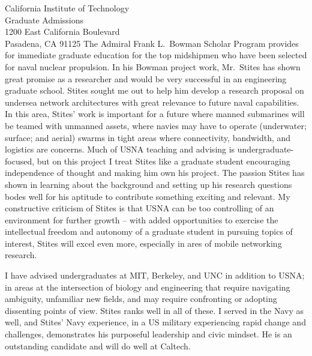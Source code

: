 \documentclass[10pt]{wrceletter}
\begin{document}
\begin{letter}{%
California Institute of Technology\\
Graduate Admissions\\
1200 East California Boulevard\\
Pasadena, CA 91125}
The Admiral Frank L.~Bowman Scholar Program provides for immediate graduate education for the top midshipmen who have been selected for naval nuclear propulsion. In his Bowman project work, Mr.~Stites has shown great promise as a researcher and would be very successful in an engineering graduate school. Stites sought me out to help him develop a research proposal on undersea network architectures with great relevance to future naval capabilities. In this area, Stites' work is important for a future where manned submarines will be teamed with unmanned assets, where navies may have to operate (underwater; surface; and aerial) swarms in tight areas where connectivity, bandwidth, and logistics are concerns. Much of USNA teaching and advising is undergraduate-focused, but on this project I treat Stites like a graduate student encouraging independence of thought and making him own his project. The passion Stites has shown in learning about the background and setting up his research questions bodes well for his aptitude to contribute something exciting and relevant. My constructive criticism of Stites is that USNA can be too controlling of an environment for further growth -- with added opportunities to exercise the intellectual freedom and autonomy of a graduate student in pursuing topics of interest, Stites will excel even more, especially in ares of mobile networking research.

I have advised undergraduates at MIT, Berkeley, and UNC in addition to USNA; in areas at the intersection of biology and engineering that require navigating ambiguity, unfamiliar new fields, and may require confronting or adopting dissenting points of view. Stites ranks well in all of these. I served in the Navy as well, and Stites' Navy experience, in a US military experiencing rapid change and challenges, demonstrates his purposeful leadership and civic mindset. He is an outstanding candidate and will do well at Caltech.

\closing{~} %

\end{letter}
\end{document}
